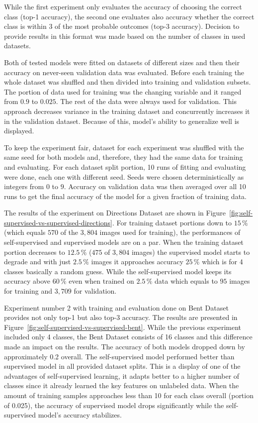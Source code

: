 While the first experiment only evaluates the accuracy of choosing the correct class (top-1 accuracy), the second one evaluates also accuracy whether the correct class is within 3 of the most probable outcomes (top-3 accuracy). Decision to provide results in this format was made based on the number of classes in used datasets.

Both of tested models were fitted on datasets of different sizes and then their accuracy on never-seen validation data was evaluated. Before each training the whole dataset was shuffled and then divided into training and validation subsets. The portion of data used for training was the changing variable and it ranged from $0.9$ to $0.025$. The rest of the data were always used for validation. This approach decreases variance in the training dataset and concurrently increases it in the validation dataset. Because of this, model's ability to generalize well is displayed.

To keep the experiment fair, dataset for each experiment was shuffled with the same seed for both models and, therefore, they had the same data for training and evaluating. For each dataset split portion, 10 runs of fitting and evaluating were done, each one with different seed. Seeds were chosen deterministically as integers from $0$ to $9$. Accuracy on validation data was then averaged over all 10 runs to get the final accuracy of the model for a given fraction of training data.

The results of the experiment on Directions Dataset are shown in Figure~\ref{fig:self-supervised-vs-supervised-directions}. For training dataset portions down to $15\,\%$ (which equals $570$ of the $3{,}804$ images used for training), the performances of self-supervised and supervised models are on a par. When the training dataset portion decreases to $12.5\,\%$ ($475$ of $3{,}804$ images) the supervised model starts to degrade and with just $2.5\,\%$ images it approaches accuracy $25\,\%$ which is for 4 classes basically a random guess. While the self-supervised model keeps its accuracy above $60\,\%$ even when trained on $2.5\,\%$ data which equals to $95$ images for training and $3{,}709$ for validation.

Experiment number 2 with training and evaluation done on Bent Dataset provides not only top-1 but also top-3 accuracy. The results are presented in Figure~\ref{fig:self-supervised-vs-supervised-bent}. While the previous experiment included only 4 classes, the Bent Dataset consists of 16 classes and this difference made an impact on the results. The accuracy of both models dropped down by approximately 0.2 overall. The self-supervised model performed better than supervised model in all provided dataset splits. This is a display of one of the advantages of self-supervised learning, it adapts better to a higher number of classes since it already learned the key features on unlabeled data. When the amount of training samples approaches less than 10 for each class overall (portion of 0.025), the accuracy of supervised model drops significantly while the self-supervised model's accuracy stabilizes.

